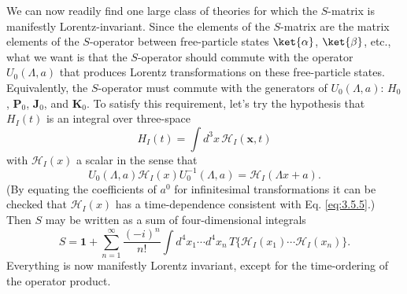 We can now readily find one large class of theories for which the $S$-matrix is manifestly
Lorentz-invariant. Since the elements of the $S$-matrix are the matrix elements of the
$S$-operator between free-particle states $\ket{\alpha}$, $\ket{\beta}$, etc., what we want is
that the $S$-operator should commute with the operator $U_0(\Lambda,a)$ that produces Lorentz
transformations on these free-particle states. Equivalently, the $S$-operator must commute with
the generators of $U_0(\Lambda,a)$: $H_0$, $\mathbf{P}_0$, $\mathbf{J}_0$, and $\mathbf{K}_0$.
To satisfy this requirement, let's try the hypothesis that $H_I(t)$ is an integral over
three-space
\begin{equation}
 H_I(t)=\int d^3x\,\mathcal{H}_I(\mathbf{x},t)
 \tag{3.5.11}\label{eq:3.5.11}
\end{equation}
with $\mathcal{H}_I(x)$ a scalar in the sense that
\begin{equation}
 U_0(\Lambda,a)\mathcal{H}_I(x)U_0^{-1}(\Lambda,a)
 =\mathcal{H}_I(\Lambda x+a).
 \tag{3.5.12}\label{eq:3.5.12}
\end{equation}
(By equating the coefficients of $a^0$ for infinitesimal transformations it can be checked that
$\mathcal{H}_I(x)$ has a time-dependence consistent with Eq. \eqref{eq:3.5.5}.) Then $S$ may be written
as a sum of four-dimensional integrals
\begin{equation}
 S=\mathbf{1}+\sum_{n=1}^{\infty}\frac{(-i)^n}{n!}
 \int d^4x_1\cdots d^4x_n\,
 T\{\mathcal{H}_I(x_1)\cdots\mathcal{H}_I(x_n)\}.
 \tag{3.5.13}\label{eq:3.5.13}
\end{equation}
Everything is now manifestly Lorentz invariant, except for the time-ordering of the operator
product.

